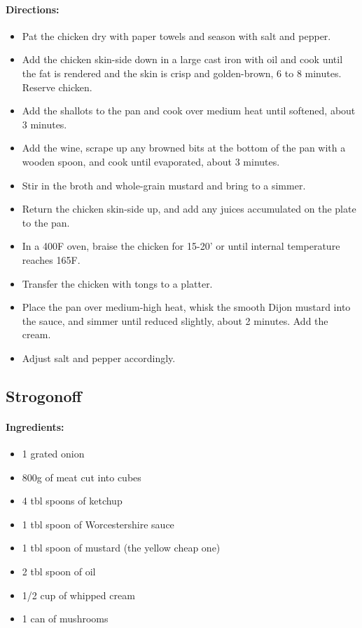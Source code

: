 \documentclass{article}
\begin{document}
\paragraph{Directions:}
\begin{itemize}
	\item Pat the chicken dry with paper towels and season with salt and pepper.
	\item Add the chicken skin-side down in a large cast iron with oil and cook until the fat is rendered and the
	skin is crisp and golden-brown, 6 to 8 minutes. Reserve chicken.
	\item Add the shallots to the pan and cook over medium heat until softened, about 3 minutes.
	\item Add the wine, scrape up any browned bits at the bottom of the pan with a wooden spoon, and cook
	until evaporated, about 3 minutes.
	\item Stir in the broth and whole-grain mustard and bring to a simmer.
	\item Return the chicken skin-side up, and add any juices accumulated on the plate to the pan.
	\item In a 400F oven, braise the chicken for 15-20’ or until internal temperature reaches 165F.
	\item Transfer the chicken with tongs to a platter.
	\item Place the pan over medium-high heat, whisk the smooth Dijon mustard into the sauce, and simmer until
	reduced slightly, about 2 minutes. Add the cream.
	\item Adjust salt and pepper accordingly.	
\end{itemize}

\subsection{Strogonoff}

\paragraph{Ingredients:}

\begin{itemize}
	\item 1 grated onion
	\item 800g of meat cut into cubes
	\item 4 tbl spoons of ketchup
	\item 1 tbl spoon of Worcestershire sauce
	\item 1 tbl spoon of mustard (the yellow cheap one)
	\item 2 tbl spoon of oil
	\item 1/2 cup of whipped cream
	\item 1 can of mushrooms
\end{itemize}
\end{document}
